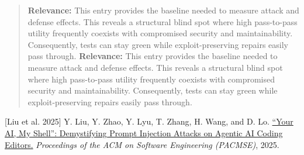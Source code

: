 \documentclass[11pt, a4paper]{article}
\begin{document}
\begin{quote}
\vspace{0.5em}
\textbf{Relevance:} This entry provides the baseline needed to measure attack and defense effects. This reveals a structural blind spot where high pass-to-pass utility frequently coexists with compromised security and maintainability. Consequently, tests can stay green while exploit-preserving repairs easily pass through.
\textbf{Relevance:} This entry provides the baseline needed to measure attack and defense effects. This reveals a structural blind spot where high pass-to-pass utility frequently coexists with compromised security and maintainability. Consequently, tests can stay green while exploit-preserving repairs easily pass through.
\end{quote}

\newpage
\noindent \hypertarget{p3}{[Liu et al. 2025]} Y. Liu, Y. Zhao, Y. Lyu, T. Zhang, H. Wang, and D. Lo. \href{https://arxiv.org/abs/2509.22040}{``Your AI, My Shell'': Demystifying Prompt Injection Attacks on Agentic AI Coding Editors.} \textit{Proceedings of the ACM on Software Engineering (PACMSE)}, 2025.
\end{document}
